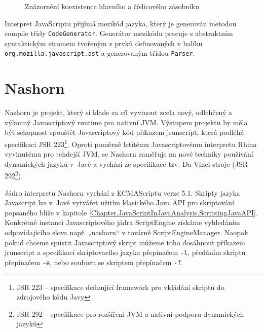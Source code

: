 \begin{figure}[H]
  \begin{center}
    \caption{Znázornění koexistence hlavního a číslicového zásobníku}
    \label{Figure.RhinoStack}
  \end{center}
\end{figure}

Interpret JavaScriptu přijímá mezikód jazyka, který je generován metodou compile třídy \texttt{CodeGenerator}. Generátor mezikódu pracuje s abstraktním syntaktickým stromem tvořeným z prvků definovaných v balíku \texttt{org.mozilla.javascript.ast} a generovaným třídou \texttt{Parser}.

\section{Nashorn}
\label{Chapter.JavaScriptInJavaAnalysis.Nashorn}

Nashorn je projekt, který si klade za cíl vyvinout zcela nový, odlehčený a výkonný Javascriptový runtime pro nativní JVM. Výstupem projektu by měla být schopnost spouštět Javascriptový kód příkazem jrunscript, která podléhá specifikaci JSR 223\footnote{JSR 223 -- specifikace definující framework pro vkládání skriptů do zdrojového kódu Javy}. Oproti poměrně letitému Javascriptovému interpretu Rhina vyvinutému pro tehdejší JVM, se Nashorn zaměřuje na nové techniky používání dynamických jazyků v~Javě a vychází ze specifikace tzv. Da Vinci stroje (JSR 292\footnote{JSR 292 -- specifikace pro rozšíření JVM o nativní podporu dynamických jazyků}). \cite{Bibliography.Nashorn.Project}

Jádro interpretu Nashorn vychází z ECMAScriptu verze 5.1. Skripty jazyka Javascript lze v~Javě vytvářet užitím klasického Java API pro skriptování popsaného blíže v kapitole \ref{Chapter.JavaScriptInJavaAnalysis.ScriptingJavaAPI}. Konkrétně instanci Javascriptového jádra ScriptEngine získáme vyhledáním odpovídajícího slova např. „nashorn“ v továrně ScriptEngineManager. Naopak pokud chceme spustit Javascriptový skript můžeme toho dosáhnout příkazem jrunscript a specifikací skriptovacího jazyka přepínačem \texttt{-l}, předáním skriptu přepínačem \texttt{-e}, nebo souboru se skriptem přepínačem \texttt{-f}.

